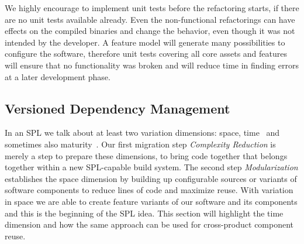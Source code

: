 We highly encourage to implement unit tests before the refactoring starts, if
there are no unit tests available already. Even the non-functional refactorings
can have effects on the compiled binaries and change the behavior, even though
it was not intended by the developer. A feature model will generate many
possibilities to configure the software, therefore unit tests covering all core
assets and features will ensure that no functionality was broken and will reduce
time in finding errors at a later development phase.

\subsection{Versioned Dependency Management}\label{dependencies}

In an SPL we talk about at least two variation dimensions: space,
time~\cite{appliedSPLE} and sometimes also maturity~\cite{bigleverwhitepaper}.
Our first migration step \textit{Complexity Reduction} is merely a step to
prepare these dimensions, to bring code together that belongs together within a
new SPL-capable build system. The second step \textit{Modularization}
establishes the space dimension by building up configurable sources or variants
of software components to reduce lines of code and maximize reuse. With
variation in space we are able to create feature variants of our software and
its components and this is the beginning of the SPL idea. This section will
highlight the time dimension and how the same approach can be used for
cross-product component reuse.

